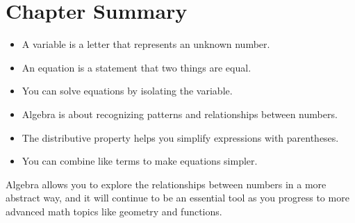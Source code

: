 \section{Chapter Summary}
\begin{itemize}
    \item A variable is a letter that represents an unknown number.
    \item An equation is a statement that two things are equal.
    \item You can solve equations by isolating the variable.
    \item Algebra is about recognizing patterns and relationships between numbers.
    \item The distributive property helps you simplify expressions with parentheses.
    \item You can combine like terms to make equations simpler.
\end{itemize}

Algebra allows you to explore the relationships between numbers in a more abstract way, and it will continue to be an essential tool as you progress to more advanced math topics like geometry and functions.

